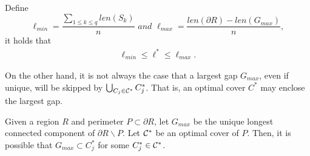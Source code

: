 \begin{proposition}\label{p:single-bounds} Define 
\[
\ell_{min} = \frac{\sum_{1\le k\le q}len(S_k)}{n}\,\,and\,\,
\ell_{max} = \frac{len(\partial R) -  len(G_{max})}{n},
\]
it holds that 
\begin{align}\label{eq:lopt} 
\ell_{min} \le \ell^* \le \ell_{max}.
\end{align}
\end{proposition}

On the other hand, it is not always the case that a largest gap $G_{max}$, 
even if unique, will be skipped by $\bigcup_{C_j \in \mathcal C^*} C_j^*$. 
That is, an optimal cover $C^*$ may enclose the largest gap. 
 
\begin{proposition}\label{p:max-no-exclusion}
Given a region $R$ and perimeter $P \subset \partial R$, let
$G_{max}$ be the unique longest connected component of $\partial R
\backslash P$. Let $\mathcal C^*$ be an optimal cover of $P$. Then, it is 
possible that $G_{max} \subset C_j^*$ for some $C_j^* \in \mathcal C^*$. 
\end{proposition}
